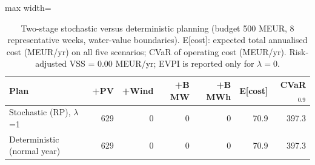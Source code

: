 \begin{table}[htbp]
\centering
\small
\caption{Two-stage stochastic versus deterministic planning (budget 500 MEUR, 8 representative weeks, water-value boundaries). E[cost]: expected total annualised cost (MEUR/yr) on all five scenarios; CVaR of operating cost (MEUR/yr). Risk-adjusted VSS = 0.00 MEUR/yr; EVPI is reported only for $\lambda=0$.}
\label{tab:stochastic}
\begin{adjustbox}{max width=\linewidth}
\begin{tabular}{lrrrrrr}
\toprule
Plan & +PV & +Wind & +B MW & +B MWh & E[cost] & CVaR$_{0.9}$ \\
\midrule
Stochastic (RP), $\lambda$=1 & 629 & 0 & 0 & 0 & 70.9 & 397.3 \\
Deterministic (normal year) & 629 & 0 & 0 & 0 & 70.9 & 397.3 \\
\bottomrule
\end{tabular}
\end{adjustbox}
\end{table}
